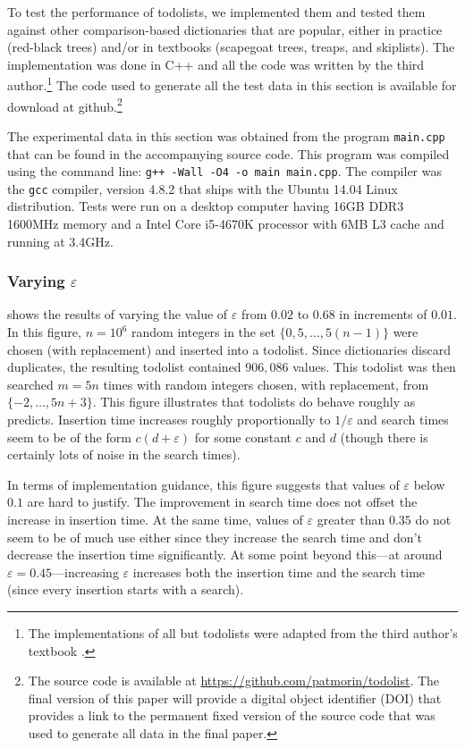 \documentclass{patmorin}
\newcommand{\eps}{\varepsilon}
\begin{document}
To test the performance of todolists, we implemented them and tested
them against other comparison-based dictionaries that are popular, either
in practice (red-black trees) and/or in textbooks (scapegoat trees,
treaps, and skiplists).  The implementation was done in C++ and all
the code was written by the third author.\footnote{The implementations
of all but todolists were adapted from the third author's textbook
\cite{morin:open}.} The code used to generate all the test data in this
section is available for download at github.\footnote{The source code
is available at \url{https://github.com/patmorin/todolist}. The final
version of this paper will provide a digital object identifier (DOI)
that provides a link to the permanent fixed version of the source code
that was used to generate all data in the final paper.}

The experimental data in this section was obtained from the program
\texttt{main.cpp} that can be found in the accompanying source code.
This program was compiled using the command line: \texttt{g++ -Wall -O4
-o main main.cpp}. The compiler was the \texttt{gcc} compiler, version
4.8.2 that ships with the Ubuntu 14.04 Linux distribution.  Tests were
run on a desktop computer having 16GB DDR3 1600MHz memory and a Intel
Core i5-4670K processor with 6MB L3 cache and running at 3.4GHz.

\subsubsection{Varying $\eps$}

 shows the results of varying the value of $\eps$ from
$0.02$ to $0.68$ in increments of $0.01$. In this figure, $n=10^6$
random integers in the set $\{0, 5,\ldots,5(n-1)\}$ were chosen
(with replacement) and inserted into a todolist. Since dictionaries
discard duplicates, the resulting todolist contained $906,086$ values.
This todolist was then searched $m=5n$ times with random integers chosen,
with replacement, from $\{-2,\ldots,5n+3\}$.  This figure illustrates
that todolists do behave roughly as  predicts.
Insertion time increases roughly proportionally to $1/\eps$ and search
times seem to be of the form $c(d+\eps)$ for some constant $c$ and $d$
(though there is certainly lots of noise in the search times).

In terms of implementation guidance, this figure suggests that values
of $\eps$ below $0.1$ are hard to justify.  The improvement in search
time does not offset the increase in insertion time.  At the same
time, values of $\eps$ greater than $0.35$ do not seem to be of much
use either since they increase the search time and don't decrease the
insertion time significantly. At some point beyond this---at around
$\eps=0.45$---increasing $\eps$ increases both the insertion time and
the search time (since every insertion starts with a search).
\end{document}
